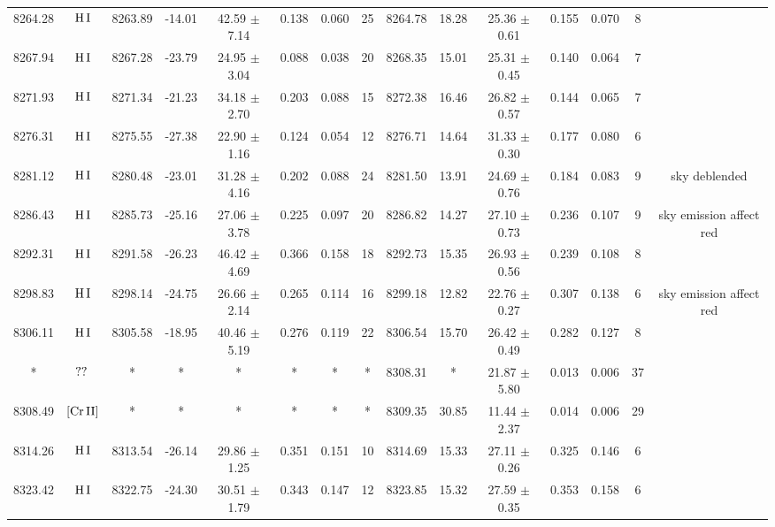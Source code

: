 \documentclass{article}
\begin{document}
\begin{table*}
\begin{adjustbox}{width=\textwidth}
\begin{tabular}{ccccccccccccccc}
8264.28 & $\mbox{H}\thinspace \mbox{I}$ & 8263.89 & -14.01 & 42.59 $\pm$ 7.14 & 0.138 & 0.060 & 25 & 8264.78 & 18.28 & 25.36 $\pm$ 0.61 & 0.155 & 0.070 & 8 &  \\
8267.94 & $\mbox{H}\thinspace \mbox{I}$ & 8267.28 & -23.79 & 24.95 $\pm$ 3.04 & 0.088 & 0.038 & 20 & 8268.35 & 15.01 & 25.31 $\pm$ 0.45 & 0.140 & 0.064 & 7 &  \\
8271.93 & $\mbox{H}\thinspace \mbox{I}$ & 8271.34 & -21.23 & 34.18 $\pm$ 2.70 & 0.203 & 0.088 & 15 & 8272.38 & 16.46 & 26.82 $\pm$ 0.57 & 0.144 & 0.065 & 7 &  \\
8276.31 & $\mbox{H}\thinspace \mbox{I}$ & 8275.55 & -27.38 & 22.90 $\pm$ 1.16 & 0.124 & 0.054 & 12 & 8276.71 & 14.64 & 31.33 $\pm$ 0.30 & 0.177 & 0.080 & 6 &  \\
8281.12 & $\mbox{H}\thinspace \mbox{I}$ & 8280.48 & -23.01 & 31.28 $\pm$ 4.16 & 0.202 & 0.088 & 24 & 8281.50 & 13.91 & 24.69 $\pm$ 0.76 & 0.184 & 0.083 & 9 &  sky deblended \\
8286.43 & $\mbox{H}\thinspace \mbox{I}$ & 8285.73 & -25.16 & 27.06 $\pm$ 3.78 & 0.225 & 0.097 & 20 & 8286.82 & 14.27 & 27.10 $\pm$ 0.73 & 0.236 & 0.107 & 9 &  sky emission affect red \\
8292.31 & $\mbox{H}\thinspace \mbox{I}$ & 8291.58 & -26.23 & 46.42 $\pm$ 4.69 & 0.366 & 0.158 & 18 & 8292.73 & 15.35 & 26.93 $\pm$ 0.56 & 0.239 & 0.108 & 8 &  \\
8298.83 & $\mbox{H}\thinspace \mbox{I}$ & 8298.14 & -24.75 & 26.66 $\pm$ 2.14 & 0.265 & 0.114 & 16 & 8299.18 & 12.82 & 22.76 $\pm$ 0.27 & 0.307 & 0.138 & 6 &  sky emission affect red \\
8306.11 & $\mbox{H}\thinspace \mbox{I}$ & 8305.58 & -18.95 & 40.46 $\pm$ 5.19 & 0.276 & 0.119 & 22 & 8306.54 & 15.70 & 26.42 $\pm$ 0.49 & 0.282 & 0.127 & 8 &  \\
* & $\mbox{??}\thinspace \mbox{}$ & * & * & * & * & * & * & 8308.31 & * & 21.87 $\pm$ 5.80 & 0.013 & 0.006 & 37 &  \\
8308.49 & $\mbox{[Cr}\thinspace \mbox{II]}$ & * & * & * & * & * & * & 8309.35 & 30.85 & 11.44 $\pm$ 2.37 & 0.014 & 0.006 & 29 &  \\
8314.26 & $\mbox{H}\thinspace \mbox{I}$ & 8313.54 & -26.14 & 29.86 $\pm$ 1.25 & 0.351 & 0.151 & 10 & 8314.69 & 15.33 & 27.11 $\pm$ 0.26 & 0.325 & 0.146 & 6 &  \\
8323.42 & $\mbox{H}\thinspace \mbox{I}$ & 8322.75 & -24.30 & 30.51 $\pm$ 1.79 & 0.343 & 0.147 & 12 & 8323.85 & 15.32 & 27.59 $\pm$ 0.35 & 0.353 & 0.158 & 6 &  \\

\end{tabular}
\end{adjustbox}
\end{table*}
\end{document}
